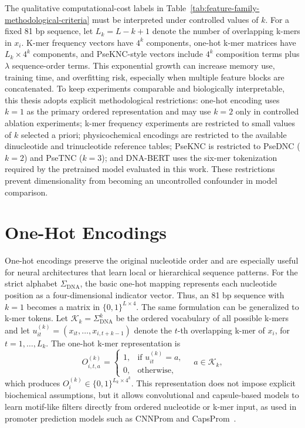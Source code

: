The qualitative computational-cost labels in Table~\ref{tab:feature-family-methodological-criteria} must be interpreted under controlled values of $k$. For a fixed 81 bp sequence, let $L_k=L-k+1$ denote the number of overlapping k-mers in $x_i$. K-mer frequency vectors have $4^k$ components, one-hot k-mer matrices have $L_k\times4^k$ components, and PseKNC-style vectors include $4^k$ composition terms plus $\lambda$ sequence-order terms. This exponential growth can increase memory use, training time, and overfitting risk, especially when multiple feature blocks are concatenated. To keep experiments comparable and biologically interpretable, this thesis adopts explicit methodological restrictions: one-hot encoding uses $k=1$ as the primary ordered representation and may use $k=2$ only in controlled ablation experiments; k-mer frequency experiments are restricted to small values of $k$ selected a priori; physicochemical encodings are restricted to the available dinucleotide and trinucleotide reference tables; PseKNC is restricted to PseDNC ($k=2$) and PseTNC ($k=3$); and DNA-BERT uses the six-mer tokenization required by the pretrained model evaluated in this work. These restrictions prevent dimensionality from becoming an uncontrolled confounder in model comparison.

\section{One-Hot Encodings}\label{sec:features-onehot}

One-hot encodings preserve the original nucleotide order and are especially useful for neural architectures that learn local or hierarchical sequence patterns. For the strict alphabet $\Sigma_{\mathrm{DNA}}$, the basic one-hot mapping represents each nucleotide position as a four-dimensional indicator vector. Thus, an 81 bp sequence with $k=1$ becomes a matrix in $\{0,1\}^{L\times4}$. The same formulation can be generalized to k-mer tokens. Let $\mathcal{K}_k=\Sigma_{\mathrm{DNA}}^{k}$ be the ordered vocabulary of all possible k-mers and let $u_{it}^{(k)}=(x_{it},\ldots,x_{i,t+k-1})$ denote the $t$-th overlapping k-mer of $x_i$, for $t=1,\ldots,L_k$. The one-hot k-mer representation is
\begin{equation}
O_{i,t,a}^{(k)}=
\begin{cases}
1, & \text{if } u_{it}^{(k)}=a,\\
0, & \text{otherwise,}
\end{cases}
\quad a\in\mathcal{K}_k,
\end{equation}
which produces $O_i^{(k)}\in\{0,1\}^{L_k\times4^k}$. This representation does not impose explicit biochemical assumptions, but it allows convolutional and capsule-based models to learn motif-like filters directly from ordered nucleotide or k-mer input, as used in promoter prediction models such as CNNProm and CapsProm~\citep{umarov2017recognition,moraes2022capsprom}.


